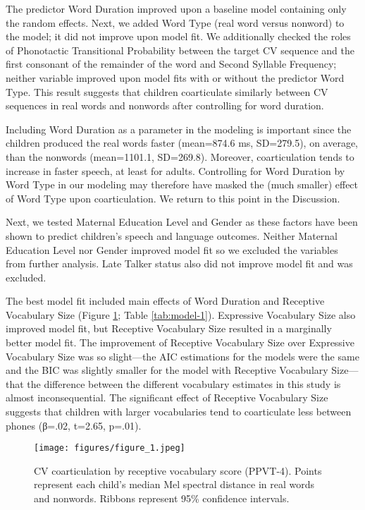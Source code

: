 \documentclass[a4paper,man,natbib,donotrepeattitle, apacite]{apa6}
\begin{document}
The predictor Word Duration improved upon a baseline model containing only the random effects. Next, we added Word Type (real word versus nonword) to the model; it did not improve upon model fit. We additionally checked the roles of Phonotactic Transitional Probability between the target CV sequence and the first consonant of the remainder of the word and Second Syllable Frequency; neither variable improved upon model fits with or without the predictor Word Type. This result suggests that children coarticulate similarly between CV sequences in real words and nonwords after controlling for word duration. 

Including Word Duration as a parameter in the modeling is important since the children produced the real words faster (mean=874.6 ms, SD=279.5), on average, than the nonwords (mean=1101.1, SD=269.8). Moreover, coarticulation tends to increase in faster speech, at least for adults. Controlling for Word Duration by Word Type in our modeling may therefore have masked the (much smaller) effect of Word Type upon coarticulation. We return to this point in the Discussion.    

Next, we tested Maternal Education Level and Gender as these factors have been shown to predict children’s speech and language outcomes. Neither Maternal Education Level nor Gender improved model fit so we excluded the variables from further analysis. Late Talker status also did not improve model fit and was excluded. 

The best model fit included main effects of Word Duration and Receptive Vocabulary Size (Figure \ref{fig:figure-1}; Table \ref{tab:model-1}). Expressive Vocabulary Size also improved model fit, but Receptive Vocabulary Size resulted in a marginally better model fit. The improvement of Receptive Vocabulary Size over Expressive Vocabulary Size was so slight---the AIC estimations for the models were the same and the BIC was slightly smaller for the model with Receptive Vocabulary Size---that the difference between the different vocabulary estimates in this study is almost inconsequential. The significant effect of Receptive Vocabulary Size suggests that children with larger vocabularies tend to coarticulate less between phones (β=.02, t=2.65,  p=.01). 

\begin{figure}[H]
\centering
\texttt{[image: figures/figure\_1.jpeg]}
\caption{\label{fig:figure-1}CV coarticulation by receptive vocabulary score (PPVT-4). Points represent each child's median Mel spectral distance in real words and nonwords. Ribbons represent 95\% confidence intervals.}
\end{figure}
\end{document}
